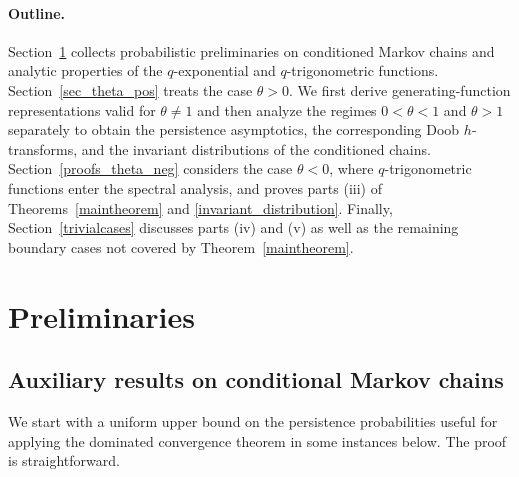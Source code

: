 \documentclass[12pt]{article}
\newcommand{\1}{\mathds{1}}
\theoremstyle{definition}
\theoremstyle{plain}
\theoremstyle{remark}
\begin{document}
\paragraph{Outline.} Section~\ref{sec_preliminaries} collects probabilistic preliminaries on conditioned Markov chains and analytic properties of the $q$-exponential and $q$-trigonometric functions. Section~\ref{sec_theta_pos} treats the case $\theta>0$. We first derive generating-function representations valid for $\theta\ne1$ and then analyze the regimes $0<\theta<1$ and $\theta>1$ separately to obtain the persistence asymptotics, the corresponding Doob $h$-transforms, and the invariant distributions of the conditioned chains. Section~\ref{proofs_theta_neg} considers the case $\theta<0$, where $q$-trigonometric functions enter the spectral analysis, and proves parts (iii) of Theorems~\ref{maintheorem} and \ref{invariant_distribution}. Finally, Section~\ref{trivialcases} discusses parts (iv) and (v) as well as the remaining boundary cases not covered by Theorem~\ref{maintheorem}.

\section{Preliminaries}\label{sec_preliminaries}
\subsection{Auxiliary results on conditional Markov chains}
We start with a uniform upper bound on the persistence probabilities useful for applying the dominated convergence theorem in some instances below. The proof is straightforward. 
\end{document}
